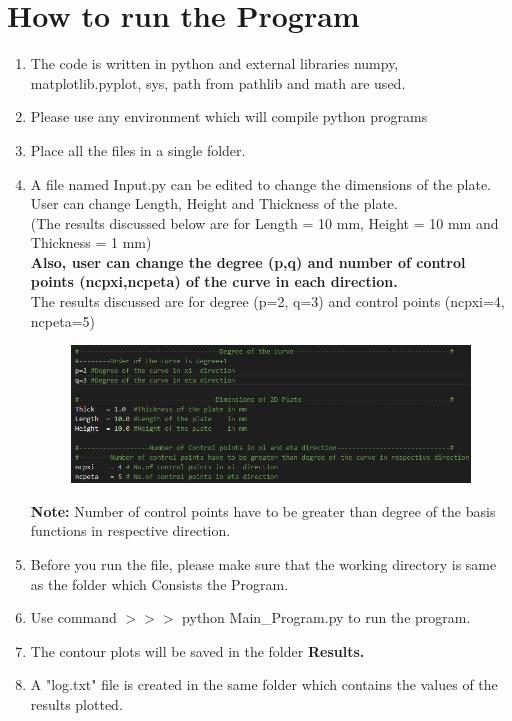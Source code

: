 \documentclass[12pt]{article}
\begin{document}
\section{How to run the Program}
\begin{enumerate}[leftmargin=*]
	\item The code is written in python and external libraries numpy, matplotlib.pyplot, sys, path from pathlib and math are used.
	\item Please use any environment which will compile python programs
	\item Place all the files in a single folder.
	\item A file named Input.py can be edited to change the dimensions of the plate. User can change Length, Height and Thickness of the plate. \\(The results discussed below are for Length = 10 mm, Height = 10 mm and Thickness = 1 mm) \\
	\textbf{Also, user can change the degree (p,q) and number of control points (ncpxi,ncpeta) of the curve in each direction.}\\
	The results discussed are for degree (p=2, q=3) and control points (ncpxi=4, ncpeta=5)
	\begin{figure}[H]
		\begin{center}
			\includegraphics[scale=0.8]{Manual_3parameters.png} 
		\end{center}	
	\end{figure}
	\textbf{Note:} Number of control points have to be greater than degree of the basis functions in respective direction.
	\item Before you run the file, please make sure that the working directory is same as the folder  which
	Consists the Program.
	\item Use command  $>>>$ python Main\_Program.py to run the program.
	\item The contour plots will be saved in the folder \textbf{Results.}
	\item A "log.txt" file is created in the same folder which contains the values of the results plotted.
	
	
\end{enumerate}
\end{document}
